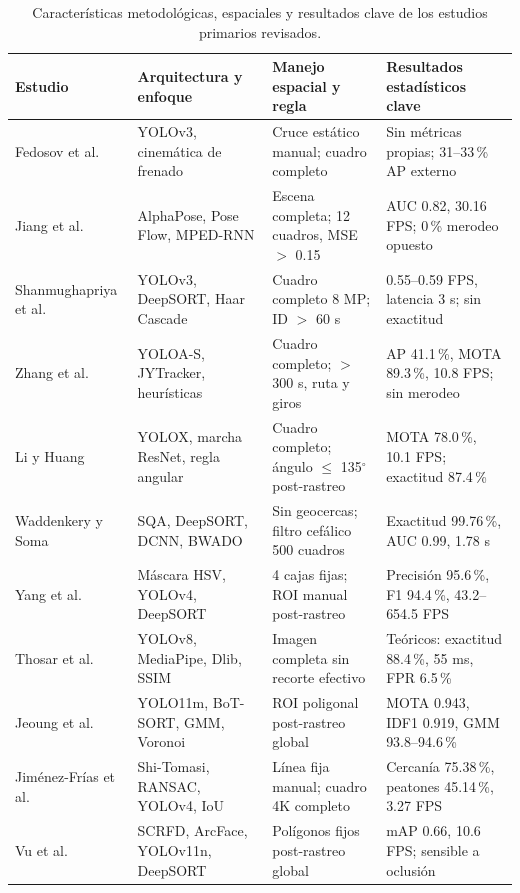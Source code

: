 \documentclass[runningheads]{llncs}
\begin{document}
\begin{table}
\caption{Características metodológicas, espaciales y resultados clave de los estudios primarios revisados.}\label{tab1}
\centering
\scriptsize
\renewcommand{\arraystretch}{1.05}
\begin{tabular}{|p{2.2cm}|p{2.9cm}|p{3.1cm}|p{3.4cm}|}
\hline
{\bfseries Estudio} & {\bfseries Arquitectura y enfoque} & {\bfseries Manejo espacial y regla} & {\bfseries Resultados estadísticos clave}\\
\hline
Fedosov et al. \cite{fedosov2021} & YOLOv3, cinemática de frenado & Cruce estático manual; cuadro completo & Sin métricas propias; 31--33\,\% AP externo\\
\hline
Jiang et al. \cite{jiang2022} & AlphaPose, Pose Flow, MPED-RNN & Escena completa; 12 cuadros, MSE $>$ 0.15 & AUC 0.82, 30.16 FPS; 0\,\% merodeo opuesto\\
\hline
Shan\-mu\-gha\-pri\-ya et al. \cite{m2022} & YOLOv3, DeepSORT, Haar Cascade & Cuadro completo 8 MP; ID $>$ 60 s & 0.55--0.59 FPS, latencia 3 s; sin exactitud\\
\hline
Zhang et al. \cite{zhang2023} & YOLOA-S, JYTracker, heurísticas & Cuadro completo; $>$ 300 s, ruta y giros & AP 41.1\,\%, MOTA 89.3\,\%, 10.8 FPS; sin merodeo\\
\hline
Li y Huang \cite{li2024} & YOLOX, marcha ResNet, regla angular & Cuadro completo; ángulo $\leq$ 135$^\circ$ post-rastreo & MOTA 78.0\,\%, 10.1 FPS; exactitud 87.4\,\%\\
\hline
Waddenkery y Soma \cite{waddenkery2024} & SQA, DeepSORT, DCNN, BWADO & Sin geocercas; filtro cefálico 500 cuadros & Exactitud 99.76\,\%, AUC 0.99, 1.78 s\\
\hline
Yang et al. \cite{yang2024} & Máscara HSV, YOLOv4, DeepSORT & 4 cajas fijas; ROI manual post-rastreo & Precisión 95.6\,\%, F1 94.4\,\%, 43.2--654.5 FPS\\
\hline
Thosar et al. \cite{thosar2025} & YOLOv8, MediaPipe, Dlib, SSIM & Imagen completa sin recorte efectivo & Teóricos: exactitud 88.4\,\%, 55 ms, FPR 6.5\,\%\\
\hline
Jeoung et al. \cite{jeoung2026} & YOLO11m, BoT-SORT, GMM, Voronoi & ROI poligonal post-rastreo global & MOTA 0.943, IDF1 0.919, GMM 93.8--94.6\,\%\\
\hline
Jiménez-Frías et al. \cite{jimenez2026} & Shi-Tomasi, RANSAC, YOLOv4, IoU & Línea fija manual; cuadro 4K completo & Cercanía 75.38\,\%, peatones 45.14\,\%, 3.27 FPS\\
\hline
Vu et al. \cite{vu2026} & SCRFD, ArcFace, YOLOv11n, DeepSORT & Polígonos fijos post-rastreo global & mAP 0.66, 10.6 FPS; sensible a oclusión\\
\hline
\end{tabular}
\end{table}
\end{document}
